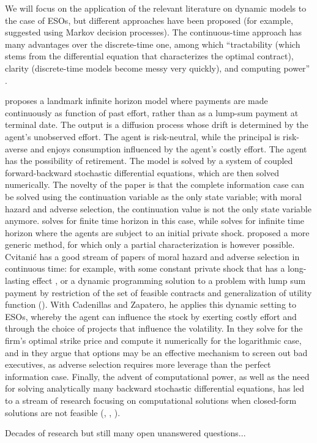     We will focus on the application of the relevant literature on dynamic models to the case of ESOs, but different approaches have been proposed (for example, \cite{plambeck2000performance} suggested using Markov decision processes). 
    The continuous-time approach has many advantages over the discrete-time one, among which ``tractability (which stems from the differential equation that characterizes the optimal contract), clarity (discrete-time models become messy very quickly), and computing power'' \cite{sannikov2013contracts}.  

    \cite{sannikov2008continuous} proposes a landmark infinite horizon model where payments are made continuously as function of past effort, rather than as a lump-sum payment at terminal date. The output is a diffusion process whose drift is determined by the agent's unobserved effort. The agent is risk-neutral, while the principal is risk-averse and enjoys consumption influenced by the agent's costly effort. The agent has the possibility of retirement. The model is solved by a system of coupled forward-backward stochastic differential equations, which are then solved numerically.
    The novelty of the paper is that the complete information case can be solved using the continuation variable as the only state variable; with moral hazard and adverse selection, the continuation value is not the only state variable anymore. \cite{sannikov2008continuous} solves for finite time horizon in this case, while \cite{cvitanic2013dynamics} solves for infinite time horizon where the agents are subject to an initial private shock. \cite{williams2009dynamic} proposed a more generic method, for which only a partial characterization is however possible. 
    Cvitanić has a good stream of papers of moral hazard and adverse selection in continuous time: for example, with some constant private shock that has a long-lasting effect \cite{cvitanic2013dynamics}, or a dynamic programming solution to a problem with lump sum payment by restriction of the set of feasible contracts and generalization of utility function (\cite{cvitanic2018dynamic}). With Cadenillas and Zapatero, he applies this dynamic setting to ESOs, whereby the agent can influence the stock by exerting costly effort and through the choice of projects that influence the volatility. In \cite{cadenillas2002executive} they solve for the firm's optimal strike price and compute it numerically for the logarithmic case, and in \cite{cadenillas2005executive} they argue that options may be an effective mechanism to screen out bad executives, as adverse selection requires more leverage than the perfect information case.
    Finally, the advent of computational power, as well as the need for solving analytically many backward stochastic differential equations, has led to a stream of research focusing on computational solutions when closed-form solutions are not feasible (\cite{azar2018computational}, \cite{dutting2021complexity}, \cite{dutting2023multi}). 




Decades of research but still many open unanswered questions...




